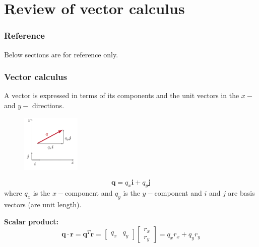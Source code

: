 \documentclass[notes]{beamer}
\begin{document}
\section{Review of vector calculus}

\begin{frame}
	\frametitle{Reference}
	Below sections are for reference only.
\end{frame}
\begin{frame}
	\frametitle{Vector calculus}
	A vector is expressed in terms of its components and the unit vectors in the $x-$ and $y-$ directions.
	\begin{figure}[ht]
		\centering
		\includegraphics[width=0.25\textwidth]{figs/vector-q.png}
	\end{figure}
	\begin{equation*}
	\mathbf{q} = q_x \mathbf{i} + q_y \mathbf{j}
	\end{equation*}
	where $q_x$ is the $x-$component and $q_y$ is the $y-$component and $i$ and $j$ are basis vectors (are unit length).
	
	\textbf{Scalar product:}
	\begin{equation*}
	\mathbf{q} \cdot \mathbf{r} = \mathbf{q}^T \mathbf{r} = \begin{bmatrix} q_x & q_y \end{bmatrix} \begin{bmatrix} r_x \\ r_y \end{bmatrix} = q_x r_x + q_y r_y
	\end{equation*}
\end{frame}
\end{document}
